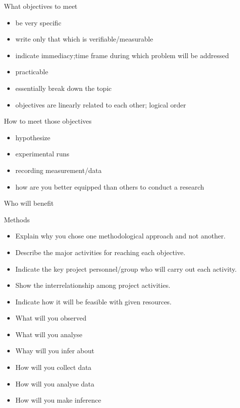 \documentclass[ignorenonframetext,aspectratio=169]{beamer}
\providecommand{\tightlist}{%
  \setlength{\itemsep}{0pt}\setlength{\parskip}{0pt}}
\begin{document}
\begin{frame}{What objectives to meet}
\protect\hypertarget{what-objectives-to-meet}{}

\begin{itemize}
\tightlist
\item
  be very specific
\item
  write only that which is verifiable/measurable
\item
  indicate immediacy;time frame during which problem will be addressed
\item
  practicable
\item
  essentially break down the topic
\item
  objectives are linearly related to each other; logical order
\end{itemize}

\end{frame}

\begin{frame}{How to meet those objectives}
\protect\hypertarget{how-to-meet-those-objectives}{}

\begin{itemize}
\tightlist
\item
  hypothesize
\item
  experimental runs
\item
  recording measurement/data
\item
  how are you better equipped than others to conduct a research
\end{itemize}

\end{frame}

\begin{frame}{Who will benefit}
\protect\hypertarget{who-will-benefit}{}

\end{frame}

\begin{frame}{Methods}
\protect\hypertarget{methods}{}

\begin{itemize}
\tightlist
\item
  Explain why you chose one methodological approach and not another.
\item
  Describe the major activities for reaching each objective.
\item
  Indicate the key project personnel/group who will carry out each
  activity.
\item
  Show the interrelationship among project activities.
\item
  Indicate how it will be feasible with given resources.
\item
  What will you observed
\item
  What will you analyse
\item
  Whay will you infer about
\item
  How will you collect data
\item
  How will you analyse data
\item
  How will you make inference
\end{itemize}

\end{frame}
\end{document}
